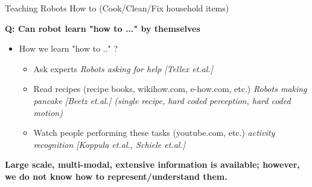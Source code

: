 \begin{frame}{Teaching Robots How to (Cook/Clean/Fix household items)}

{\bf Q: Can robot learn "how to ..." by themselves}

\begin{itemize}
\item How we learn "how to .." ?
\begin{itemize}
\item Ask experts \quad \emph{Robots asking for help [Tellex et.al.]}
\item Read recipes (recipe books, wikihow.com, e-how.com, etc.) \quad \emph{ Robots making pancake [Beetz et.al.] (single recipe, hard coded perception, hard coded motion)}
\item Watch people performing these tasks (youtube.com, etc.) \quad \emph{activity recognition [Koppula et.al.,  Schiele et.al.]}
\end{itemize}
\end{itemize}
\bf{Large scale, multi-modal, extensive information is available; however, we do not know how to represent/understand them.}	
\end{frame}


